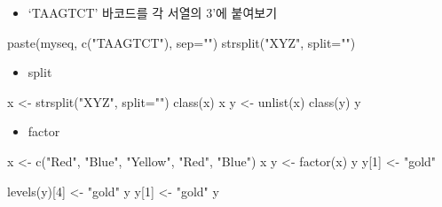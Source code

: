 \documentclass[
]{book}
\newenvironment{Shaded}{\begin{snugshade}}{\end{snugshade}}
\newcommand{\AttributeTok}[1]{\textcolor[rgb]{0.77,0.63,0.00}{#1}}
\newcommand{\DecValTok}[1]{\textcolor[rgb]{0.00,0.00,0.81}{#1}}
\newcommand{\FunctionTok}[1]{\textcolor[rgb]{0.00,0.00,0.00}{#1}}
\newcommand{\NormalTok}[1]{#1}
\newcommand{\OtherTok}[1]{\textcolor[rgb]{0.56,0.35,0.01}{#1}}
\newcommand{\StringTok}[1]{\textcolor[rgb]{0.31,0.60,0.02}{#1}}
\providecommand{\tightlist}{%
  \setlength{\itemsep}{0pt}\setlength{\parskip}{0pt}}
\begin{document}
\begin{itemize}
\tightlist
\item
  `TAAGTCT' 바코드를 각 서열의 3'에 붙여보기
\end{itemize}

\begin{Shaded}
\begin{Highlighting}[]
\FunctionTok{paste}\NormalTok{(myseq, }\FunctionTok{c}\NormalTok{(}\StringTok{"TAAGTCT"}\NormalTok{), }\AttributeTok{sep=}\StringTok{""}\NormalTok{)}
\FunctionTok{strsplit}\NormalTok{(}\StringTok{"XYZ"}\NormalTok{, }\AttributeTok{split=}\StringTok{""}\NormalTok{)}
\end{Highlighting}
\end{Shaded}

\begin{itemize}
\tightlist
\item
  split
\end{itemize}

\begin{Shaded}
\begin{Highlighting}[]
\NormalTok{x }\OtherTok{\textless{}{-}} \FunctionTok{strsplit}\NormalTok{(}\StringTok{"XYZ"}\NormalTok{, }\AttributeTok{split=}\StringTok{""}\NormalTok{)}
\FunctionTok{class}\NormalTok{(x)}
\NormalTok{x}
\NormalTok{y }\OtherTok{\textless{}{-}} \FunctionTok{unlist}\NormalTok{(x)}
\FunctionTok{class}\NormalTok{(y)}
\NormalTok{y}
\end{Highlighting}
\end{Shaded}

\begin{itemize}
\tightlist
\item
  factor
\end{itemize}

\begin{Shaded}
\begin{Highlighting}[]
\NormalTok{x }\OtherTok{\textless{}{-}} \FunctionTok{c}\NormalTok{(}\StringTok{"Red"}\NormalTok{, }\StringTok{"Blue"}\NormalTok{, }\StringTok{"Yellow"}\NormalTok{, }\StringTok{"Red"}\NormalTok{, }\StringTok{"Blue"}\NormalTok{)}
\NormalTok{x}
\NormalTok{y }\OtherTok{\textless{}{-}} \FunctionTok{factor}\NormalTok{(x)}
\NormalTok{y}
\NormalTok{y[}\DecValTok{1}\NormalTok{] }\OtherTok{\textless{}{-}} \StringTok{"gold"}

\FunctionTok{levels}\NormalTok{(y)[}\DecValTok{4}\NormalTok{] }\OtherTok{\textless{}{-}} \StringTok{"gold"}
\NormalTok{y}
\NormalTok{y[}\DecValTok{1}\NormalTok{] }\OtherTok{\textless{}{-}} \StringTok{"gold"}
\NormalTok{y}
\end{Highlighting}
\end{Shaded}
\end{document}
